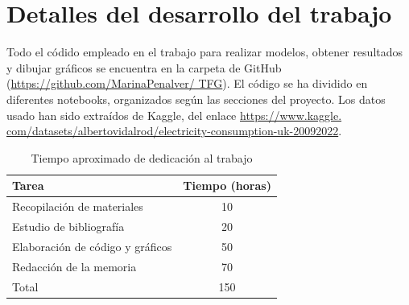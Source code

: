 \documentclass[12pt,twoside]{article}
\begin{document}
\begin{thebibliography}{100}





\end{thebibliography}



\newpage
\appendix

\section{Detalles del desarrollo del trabajo}
Todo el códido empleado en el trabajo para realizar modelos, obtener resultados y dibujar gráficos se encuentra en la carpeta de GitHub (\href{https://github.com/MarinaPenalver/TFG}{https://github.com/MarinaPenalver/ TFG}). El código se ha dividido en diferentes notebooks, organizados según las secciones del proyecto. Los datos usado han sido extraídos de Kaggle, del enlace \href{https://www.kaggle.com/datasets/albertovidalrod/electricity-consumption-uk-20092022}{https://www.kaggle.
com/datasets/albertovidalrod/electricity-consumption-uk-20092022}.



\begin{table}[ht] 
\centering
\begin{tabular}{lc} 
  \hline
 Tarea & Tiempo (horas) \\ 
  \hline
Recopilación de materiales &   10 \\ 
Estudio de bibliografía &   20 \\ 
Elaboración de código y gráficos &  50 \\ 
Redacción de la memoria &  70 \\
 \hline
Total & 150\\
\hline
\end{tabular}
\caption{Tiempo aproximado de dedicación al trabajo} \label{tab{02}}
\end{table}
\end{document}
